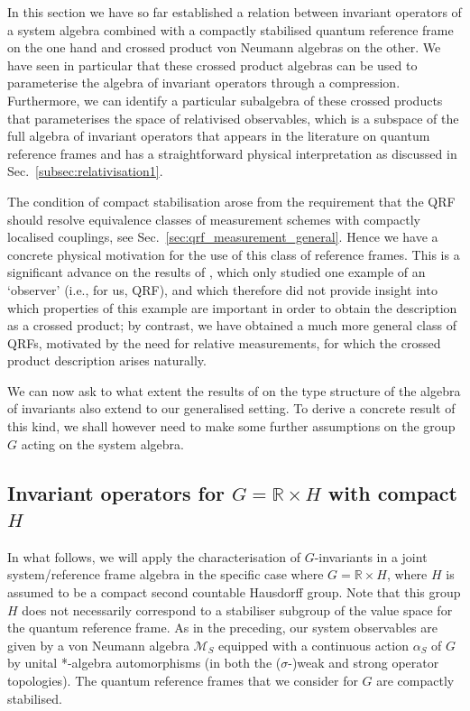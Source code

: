 \documentclass[sn-mathphys-num]{sn-jnl}%
\newcommand{\RR}{\mathbb{R}}
\numberwithin{equation}{section}
\theoremstyle{thmstyleone}%
\theoremstyle{thmstyletwo}%
\theoremstyle{thmstylethree}%
\begin{document}
    
    
    
    In this section we have so far established a relation between invariant operators of a system algebra combined with a compactly stabilised quantum reference frame on the one hand and crossed product von Neumann algebras on the other. 
    We have seen in particular that these crossed product algebras can be used to parameterise the algebra of invariant operators through a compression. Furthermore, we can identify a particular subalgebra of these crossed products that parameterises the space of relativised observables, which is a subspace of the full algebra of invariant operators that appears in the literature on quantum reference frames and has a straightforward physical interpretation as discussed in Sec.\ \ref{subsec:relativisation1}.

    The condition of compact stabilisation arose from the requirement that the QRF should resolve equivalence classes of measurement schemes with compactly localised couplings, see Sec.\ \ref{sec:qrf_measurement_general}. Hence we have a concrete physical motivation for the use of this class of reference frames. This is a significant advance on the results of \cite{chandrasekaran2023algebra}, which only studied one example of an `observer' (i.e., for us, QRF), and which therefore did not provide insight into which properties of this example are important in order to obtain the description as a crossed product; by contrast, we have obtained a much more general class of QRFs, motivated by the need for relative measurements, for which the crossed product description arises naturally.
    
    We can now ask to what extent the results of \cite{chandrasekaran2023algebra} on the type structure of the algebra of invariants also extend to our generalised setting.  To derive a concrete result of this kind, we shall however need to make some further assumptions on the group $G$ acting on the system algebra.
    
\subsection{Invariant operators for $G=\RR\times H$ with compact $H$}
\label{sec:RHcase}
In what follows, we will apply the characterisation of $G$-invariants in a joint system/reference frame algebra in the specific case where $G = \RR \times H$, where $H$ is assumed to be a compact second countable Hausdorff group. Note that this group $H$ does not necessarily correspond to a stabiliser subgroup of the value space for the quantum reference frame.  As in the preceding, our system observables are given by a von Neumann algebra $\mathcal{M}_S$ equipped with a continuous action $\alpha_S$ of $G$ by unital *-algebra automorphisms (in both the ($\sigma$-)weak and strong operator topologies). The quantum reference frames that we consider for $G$ are compactly stabilised.
\end{document}
